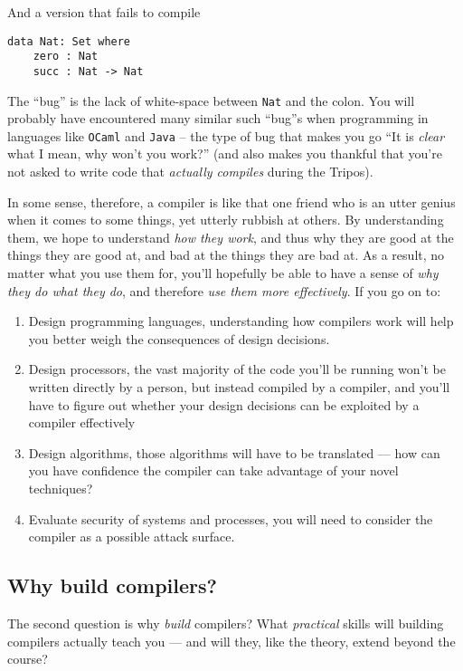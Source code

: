 And   a version that fails to compile 

\begin{code}
\label{code:agda-nat-bad}
\begin{verbatim}
data Nat: Set where
    zero : Nat
    succ : Nat -> Nat
\end{verbatim}
\end{code}

The ``bug'' is the lack of white-space between \texttt{Nat} and the colon. You will probably have encountered many similar such ``bug''s when programming in languages like \texttt{OCaml} and \texttt{Java} -- the type of bug that makes you go ``It is \emph{clear} what I mean, why won't you work?'' (and also makes you thankful that you're not asked to write code that \emph{actually compiles} during the Tripos).

In some sense, therefore, a compiler is like that one friend who is an utter genius when it comes to some things, yet utterly rubbish at others. By understanding them, we hope to understand \emph{how they work}, and thus why they are good at the things they are good at, and bad at the things they are bad at. As a result, no matter what you use them for, you'll hopefully be able to have a sense of \emph{why they do what they do}, and therefore \emph{use them more effectively}. If you go on to:

\begin{enumerate}
    \item Design programming languages, understanding how compilers work will help you better weigh the consequences of design decisions. 
    \item Design processors, the vast majority of the code you'll be running won't be written directly by a person, but instead compiled by a compiler, and you'll have to figure out whether your design decisions can be exploited by a compiler effectively
    \item Design algorithms, those algorithms will have to be translated --- how can you have confidence the compiler can take advantage of your novel techniques?
    \item Evaluate security of systems and processes, you will need to consider the compiler as a possible attack surface.
\end{enumerate}

\subsection{Why build compilers?}
The second question is why \emph{build} compilers? What \emph{practical} skills will building compilers actually teach you --- and will they, like the theory, extend beyond the course?

